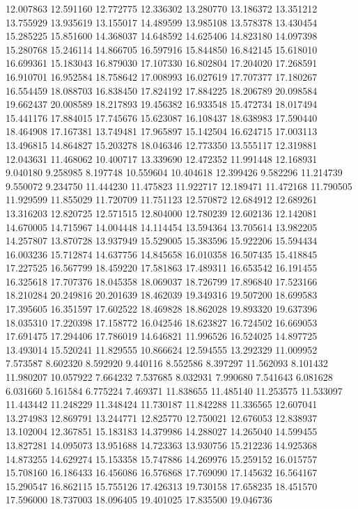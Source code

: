 12.007863
12.591160
12.772775
12.336302
13.280770
13.186372
13.351212
13.755929
13.935619
13.155017
14.489599
13.985108
13.578378
13.430454
15.285225
15.851600
14.368037
14.648592
14.625406
14.823180
14.097398
15.280768
15.246114
14.866705
16.597916
15.844850
16.842145
15.618010
16.699361
15.183043
16.879030
17.107330
16.802804
17.204020
17.268591
16.910701
16.952584
18.758642
17.008993
16.027619
17.707377
17.180267
16.554459
18.088703
16.838450
17.824192
17.884225
18.206789
20.098584
19.662437
20.008589
18.217893
19.456382
16.933548
15.472734
18.017494
15.441176
17.884015
17.745676
15.623087
16.108437
18.638983
17.590440
18.464908
17.167381
13.749481
17.965897
15.142504
16.624715
17.003113
13.496815
14.864827
15.203278
18.046346
12.773350
13.555117
12.319881
12.043631
11.468062
10.400717
13.339690
12.472352
11.991448
12.168931
9.040180
9.258985
8.197748
10.559604
10.404618
12.399426
9.582296
11.214739
9.550072
9.234750
11.444230
11.475823
11.922717
12.189471
11.472168
11.790505
11.929599
11.855029
11.720709
11.751123
12.570872
12.684912
12.689261
13.316203
12.820725
12.571515
12.804000
12.780239
12.602136
12.142081
14.670005
14.715967
14.004448
14.114454
13.594364
13.705614
13.982205
14.257807
13.870728
13.937949
15.529005
15.383596
15.922206
15.594434
16.003236
15.712874
14.637756
14.845658
16.010358
16.507435
15.418845
17.227525
16.567799
18.459220
17.581863
17.489311
16.653542
16.191455
16.325618
17.707376
18.045358
18.069037
18.726799
17.896840
17.523166
18.210284
20.249816
20.201639
18.462039
19.349316
19.507200
18.699583
17.395605
16.351597
17.602522
18.469828
18.862028
19.893320
19.637396
18.035310
17.220398
17.158772
16.042546
18.623827
16.724502
16.669053
17.691475
17.294406
17.786019
14.646821
11.996526
16.524025
14.897725
13.493014
15.520241
11.829555
10.866624
12.594555
13.292329
11.009952
7.573587
8.602320
8.592920
9.440116
8.552586
8.397297
11.562093
8.101432
11.980207
10.057922
7.664232
7.537685
8.032931
7.990680
7.541643
6.081628
6.031660
5.161584
6.775224
7.469371
11.838655
11.485140
11.253575
11.533097
11.443442
11.248229
11.348424
11.730187
11.842288
11.336565
12.607041
13.274983
12.869791
13.244771
12.825770
12.750021
12.676053
12.838937
13.102004
12.367851
15.183183
14.379986
14.288027
14.265040
14.599455
13.827281
14.095073
13.951688
14.723363
13.930756
15.212236
14.925368
14.873255
14.629274
15.153358
15.747886
14.269976
15.259152
16.015757
15.708160
16.186433
16.456086
16.576868
17.769090
17.145632
16.564167
15.290547
16.862115
15.755126
17.426313
19.730158
17.658235
18.451570
17.596000
18.737003
18.096405
19.401025
17.835500
19.046736
